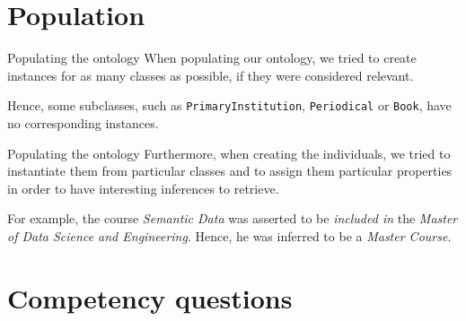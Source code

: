 \documentclass[12pt]{beamer}
\begin{document}
\section{Population}

\begin{frame}{Populating the ontology}
    When \alert{populating} our ontology, we tried to create instances for as many classes as possible, if they were considered \alert{relevant}.
    
    Hence, some subclasses, such as \texttt{PrimaryInstitution}, \texttt{Periodical} or \texttt{Book}, have no corresponding instances.
\end{frame}

\begin{frame}{Populating the ontology}
    Furthermore, when creating the individuals, we tried to instantiate them from particular \alert{classes} and to assign them particular \alert{properties} in order to have interesting \alert{inferences} to retrieve.
    
    For example, the course \emph{Semantic Data} was asserted to be \emph{included in} the \emph{Master of Data Science and Engineering}. Hence, he was inferred to be a \emph{Master Course}.
\end{frame}

\section{Competency questions}
\end{document}
